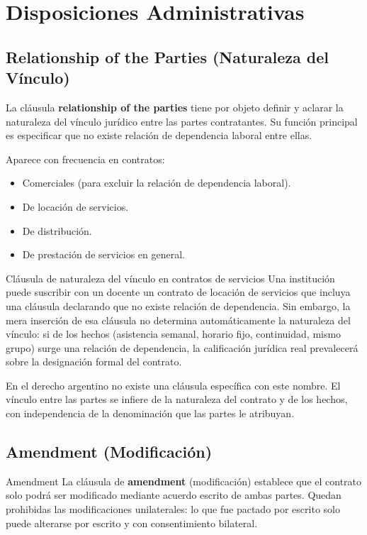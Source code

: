 \documentclass[12pt,oneside]{book}
\begin{document}
\chapter{Disposiciones Administrativas}

\section{Relationship of the Parties (Naturaleza del Vínculo)}

La cláusula \textbf{relationship of the parties} tiene por objeto definir
y aclarar la naturaleza del vínculo jurídico entre las partes contratantes.
Su función principal es especificar que no existe relación de dependencia
laboral entre ellas.

Aparece con frecuencia en contratos:
\begin{itemize}
    \item Comerciales (para excluir la relación de dependencia laboral).
    \item De locación de servicios.
    \item De distribución.
    \item De prestación de servicios en general.
\end{itemize}

\begin{example}{Cláusula de naturaleza del vínculo en contratos de servicios}
Una institución puede suscribir con un docente un contrato de locación de
servicios que incluya una cláusula declarando que no existe relación de
dependencia. Sin embargo, la mera inserción de esa cláusula no determina
automáticamente la naturaleza del vínculo: si de los hechos (asistencia
semanal, horario fijo, continuidad, mismo grupo) surge una relación de
dependencia, la calificación jurídica real prevalecerá sobre la
designación formal del contrato.
\end{example}

En el derecho argentino no existe una cláusula específica con este nombre.
El vínculo entre las partes se infiere de la naturaleza del contrato y de
los hechos, con independencia de la denominación que las partes le
atribuyan.

\section{Amendment (Modificación)}

\begin{definition}{Amendment}
La cláusula de \textbf{amendment} (modificación) establece que el
contrato solo podrá ser modificado mediante acuerdo escrito de ambas
partes. Quedan prohibidas las modificaciones unilaterales: lo que fue
pactado por escrito solo puede alterarse por escrito y con consentimiento
bilateral.
\end{definition}
\end{document}
